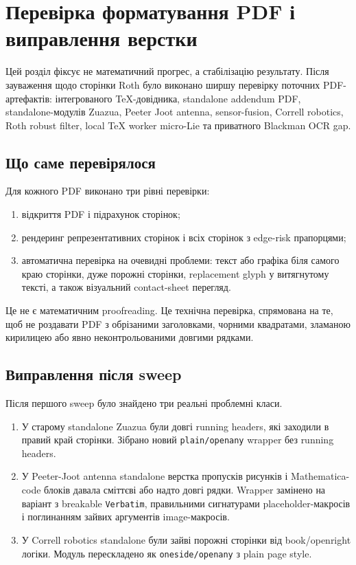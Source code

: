 
\chapter{Перевірка форматування PDF і виправлення верстки}
\label{chap:session08_pdf_qa}

Цей розділ фіксує не математичний прогрес, а стабілізацію результату. Після зауваження щодо сторінки Roth було виконано ширшу перевірку поточних PDF-артефактів: інтегрованого TeX-довідника, standalone addendum PDF, standalone-модулів Zuazua, Peeter Joot antenna, sensor-fusion, Correll robotics, Roth robust filter, local TeX worker micro-Lie та приватного Blackman OCR gap.

\section{Що саме перевірялося}
Для кожного PDF виконано три рівні перевірки:
\begin{enumerate}
\item відкриття PDF і підрахунок сторінок;
\item рендеринг репрезентативних сторінок і всіх сторінок з edge-risk прапорцями;
\item автоматична перевірка на очевидні проблеми: текст або графіка біля самого краю сторінки, дуже порожні сторінки, replacement glyph у витягнутому тексті, а також візуальний contact-sheet перегляд.
\end{enumerate}

Це не є математичним proofreading. Це технічна перевірка, спрямована на те, щоб не роздавати PDF з обрізаними заголовками, чорними квадратами, зламаною кирилицею або явно неконтрольованими довгими рядками.

\section{Виправлення після sweep}
Після першого sweep було знайдено три реальні проблемні класи.
\begin{enumerate}
\item У старому standalone Zuazua були довгі running headers, які заходили в правий край сторінки. Зібрано новий \texttt{plain/openany} wrapper без running headers.
\item У Peeter-Joot antenna standalone верстка пропусків рисунків і Mathematica-code блоків давала сміттєві або надто довгі рядки. Wrapper замінено на варіант з breakable \texttt{Verbatim}, правильними сигнатурами placeholder-макросів і поглинанням зайвих аргументів image-макросів.
\item У Correll robotics standalone були зайві порожні сторінки від book/openright логіки. Модуль перескладено як \texttt{oneside/openany} з plain page style.
\end{enumerate}

